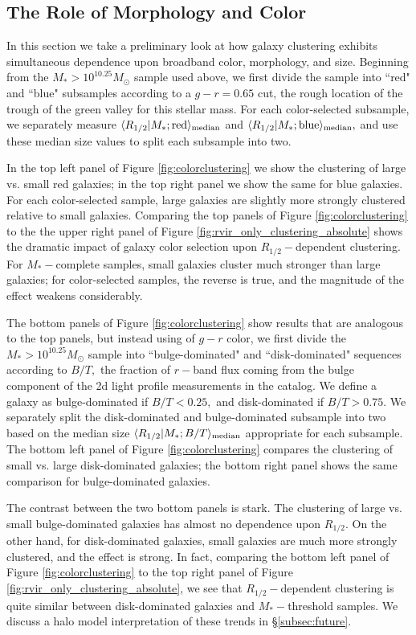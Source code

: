 \documentclass[usenatbib,usegraphicx,letterpaper]{mn2e}
\newcommand{\rhalf}{R_{1/2}}
\newcommand{\mstar}{M_{\ast}}
\newcommand{\median}[2]{\langle{#1}\vert{#2}\rangle_{\rm median}}
\newcommand{\msun}{M_\odot}
\begin{document}
\subsection{The Role of Morphology and Color}
\label{subsec:colormorph}

In this section we take a preliminary look at how galaxy clustering exhibits simultaneous dependence upon broadband color, morphology, and size. Beginning from the $\mstar>10^{10.25}\msun$ sample used above, we first divide the sample into ``red" and ``blue" subsamples according to a $g-r=0.65$ cut, the rough location of the trough of the green valley for this stellar mass. For each color-selected subsample, we separately measure $\median{\rhalf}{\mstar; {\rm red}}$ and $\median{\rhalf}{\mstar; {\rm blue}},$ and use these median size values to split each subsample into two. 

In the top left panel of Figure \ref{fig:colorclustering} we show the clustering of large vs. small red galaxies; in the top right panel we show the same for blue galaxies. For each color-selected sample, large galaxies are slightly more strongly clustered relative to small galaxies. Comparing the top panels of Figure \ref{fig:colorclustering} to the the upper right panel of Figure \ref{fig:rvir_only_clustering_absolute} shows the dramatic impact of galaxy color selection upon $\rhalf-$dependent clustering. For $\mstar-$complete samples, small galaxies cluster much stronger than large galaxies; for color-selected samples, the reverse is true, and the magnitude of the effect weakens considerably.

The bottom panels of Figure \ref{fig:colorclustering} show results that are analogous to the top panels, but instead using of $g-r$ color, we first divide the $\mstar>10^{10.25}\msun$ sample into ``bulge-dominated" and ``disk-dominated" sequences according to $B/T,$ the fraction of $r-$band flux coming from the bulge component of the 2d light profile measurements in the \citet{meert_etal15} catalog. We define a galaxy as bulge-dominated if $B/T<0.25,$ and disk-dominated if $B/T>0.75.$ We separately split the disk-dominated and bulge-dominated subsample into two based on the median size $\median{\rhalf}{\mstar;B/T}$ appropriate for each subsample. The bottom left panel of Figure \ref{fig:colorclustering} compares the clustering of small vs. large disk-dominated galaxies; the bottom right panel shows the same comparison for bulge-dominated galaxies. 

The contrast between the two bottom panels is stark. The clustering of large vs. small bulge-dominated galaxies has almost no dependence upon $\rhalf.$ On the other hand, for disk-dominated galaxies, small galaxies are much more strongly clustered, and the effect is strong. In fact, comparing the bottom left panel of Figure \ref{fig:colorclustering} to the top right panel of Figure \ref{fig:rvir_only_clustering_absolute}, we see that $\rhalf-$dependent clustering is quite similar between disk-dominated galaxies and $\mstar-$threshold samples. We discuss a halo model interpretation of these trends in \S\ref{subsec:future}. 
\end{document}
